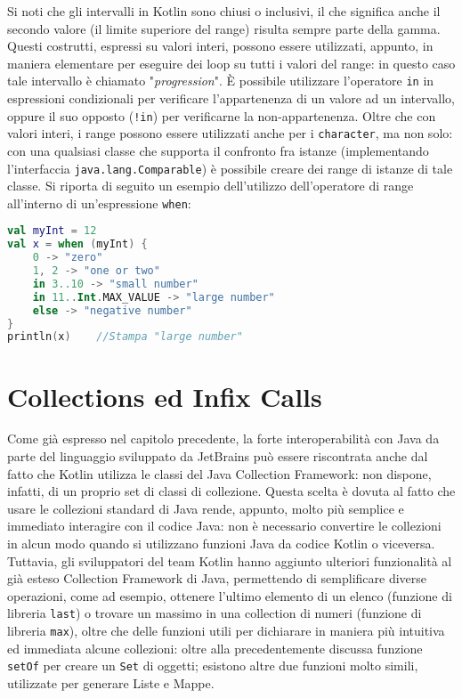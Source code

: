 Si noti che gli intervalli in Kotlin sono chiusi o inclusivi, il che significa anche il secondo valore (il limite superiore del range) risulta sempre parte della gamma. Questi costrutti, espressi su valori interi, possono essere utilizzati, appunto, in maniera elementare per eseguire dei loop su tutti i valori del range: in questo caso tale intervallo è chiamato "{\em progression}". È possibile utilizzare l'operatore \texttt{in} in espressioni condizionali per verificare l’appartenenza di un valore ad un intervallo, oppure il suo opposto (\texttt{!in}) per verificarne la non-appartenenza. Oltre che con valori interi, i range possono essere utilizzati anche per i \texttt{character}, ma non solo: con una qualsiasi classe che supporta il confronto fra istanze (implementando l'interfaccia \texttt{java.lang.Comparable}) è possibile creare dei range di istanze di tale classe. Si riporta di seguito un esempio dell'utilizzo dell'operatore di range all'interno di un'espressione \texttt{when}:\\

\begin{lstlisting}[caption={Operatore di range con valori interi all'interno di una espressione \texttt{when}}, captionpos=b, label={lst:exampleRangeWhen}, language=Kotlin]
val myInt = 12
val x = when (myInt) {
    0 -> "zero"
    1, 2 -> "one or two"
    in 3..10 -> "small number"
    in 11..Int.MAX_VALUE -> "large number"
    else -> "negative number"
}
println(x)    //Stampa "large number"
\end{lstlisting}

\section{Collections ed Infix Calls}
Come già espresso nel capitolo precedente, la forte interoperabilità con Java da parte del linguaggio sviluppato da JetBrains può essere riscontrata anche dal fatto che Kotlin utilizza le classi del Java Collection Framework: non dispone, infatti, di un proprio set di classi di collezione. Questa scelta è dovuta al fatto che usare le collezioni standard di Java rende, appunto, molto più semplice e immediato interagire con il codice Java: non è necessario convertire le collezioni in alcun modo quando si utilizzano funzioni Java da codice Kotlin o viceversa. Tuttavia, gli sviluppatori del team Kotlin hanno aggiunto ulteriori funzionalità al già esteso Collection Framework di Java, permettendo di semplificare diverse operazioni, come ad esempio, ottenere l'ultimo elemento di un elenco (funzione di libreria \texttt{last}) o trovare un massimo in una collection di numeri (funzione di libreria \texttt{max}), oltre che delle funzioni utili per dichiarare in maniera più intuitiva ed immediata alcune collezioni: oltre alla precedentemente discussa funzione \texttt{setOf} per creare un \texttt{Set} di oggetti; esistono altre due funzioni molto simili, utilizzate per generare Liste e Mappe.\\

